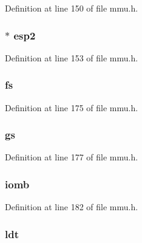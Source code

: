 Definition at line 150 of file mmu.\-h.

\hypertarget{structtaskstate_abfc181b97d3a3bf5afdc662d5d345764}{
\subsubsection[{esp2}]{$\ast$ esp2}}\label{structtaskstate_abfc181b97d3a3bf5afdc662d5d345764}


Definition at line 153 of file mmu.\-h.

\hypertarget{structtaskstate_a5f3d679db589770026f3d927f3fed7b7}{
\subsubsection[{fs}]{ fs}}\label{structtaskstate_a5f3d679db589770026f3d927f3fed7b7}


Definition at line 175 of file mmu.\-h.

\hypertarget{structtaskstate_aaeba1ea8da31d7740b55bc9d8efcacc5}{
\subsubsection[{gs}]{ gs}}\label{structtaskstate_aaeba1ea8da31d7740b55bc9d8efcacc5}


Definition at line 177 of file mmu.\-h.

\hypertarget{structtaskstate_a82c42ef4aa57a3f121cc73f016e56f50}{
\subsubsection[{iomb}]{ iomb}}\label{structtaskstate_a82c42ef4aa57a3f121cc73f016e56f50}


Definition at line 182 of file mmu.\-h.

\hypertarget{structtaskstate_a1cef9a62d2a7bec301cd750e9dad4753}{
\subsubsection[{ldt}]{ ldt}}\label{structtaskstate_a1cef9a62d2a7bec301cd750e9dad4753}


